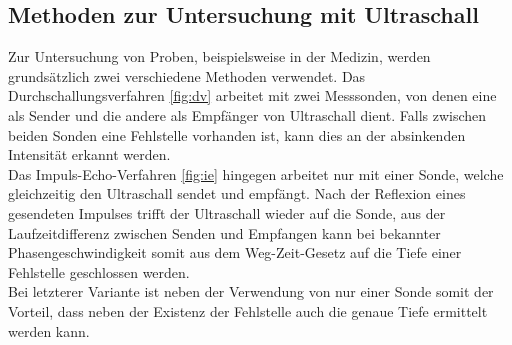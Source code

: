 \subsection{Methoden zur Untersuchung mit Ultraschall}
Zur Untersuchung von Proben, beispielsweise in der Medizin, werden grundsätzlich zwei verschiedene Methoden verwendet.
Das Durchschallungsverfahren \ref{fig:dv} arbeitet mit zwei Messsonden, von denen eine als Sender und die andere als Empfänger von Ultraschall dient.
Falls zwischen beiden Sonden eine Fehlstelle vorhanden ist, kann dies an der absinkenden Intensität erkannt werden.\\
Das Impuls-Echo-Verfahren \ref{fig:ie} hingegen arbeitet nur mit einer Sonde, welche gleichzeitig den Ultraschall sendet und empfängt.
Nach der Reflexion eines gesendeten Impulses trifft der Ultraschall wieder auf die Sonde, aus der Laufzeitdifferenz zwischen Senden und Empfangen kann bei bekannter Phasengeschwindigkeit somit aus dem Weg-Zeit-Gesetz auf die Tiefe einer Fehlstelle geschlossen werden.\\
Bei letzterer Variante ist neben der Verwendung von nur einer Sonde somit der Vorteil, dass neben der Existenz der Fehlstelle auch die genaue Tiefe ermittelt werden kann.



